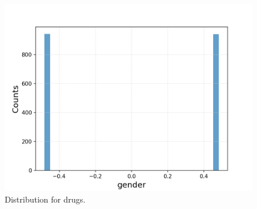 \documentclass{article}
\begin{document}
\begin{figure}[h!]
\begin{minipage}[b]{0.32\textwidth}
	\end{minipage}
	\begin{minipage}[b]{0.32\textwidth}
		\includegraphics[width=\textwidth]{plots/drugsPlots/gender.png}
	\end{minipage}
	\caption{Distribution for drugs.}
	\label{drugs}
\end{figure}
\end{document}
